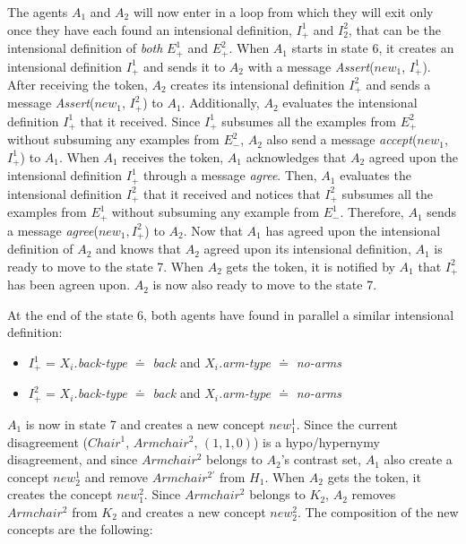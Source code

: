 The agents $A_{1}$ and $A_{2}$ will now enter in a loop from which they will exit only once they have each found an intensional definition, $I^{1}_{+}$ and $I^{2}_{2}$, that can be the intensional definition of  \emph{both} $E^{1}_{+}$ and $E^{2}_{+}$. When $A_{1}$ starts in state 6, it creates an intensional definition $I^{1}_{+}$ and sends it to $A_{2}$ with a message \emph{Assert}($new_1$, $I^{1}_{+}$). After receiving the token, $A_{2}$ creates its intensional definition  $I^{2}_{+}$ and sends a message \emph{Assert}($new_1$, $I^{2}_{+}$) to $A_{1}$. Additionally, $A_{2}$ evaluates the intensional definition $I^{1}_{+}$ that it received. Since $I^{1}_{+}$ subsumes all the examples from $E^{2}_{+}$ without subsuming any examples from $E^{2}_{-}$, $A_{2}$ also send a message \emph{accept}($new_1$, $I^{1}_{+}$) to $A_{1}$. When $A_{1}$ receives the token, $A_{1}$ acknowledges that $A_{2}$ agreed upon the intensional definition $I^{1}_{+}$ through a message \emph{agree}. Then, $A_{1}$ evaluates the intensional definition $I^{2}_{+}$ that it received and notices that $I^{2}_{+}$ subsumes all the examples from $E^{1}_{+}$ without subsuming any example from $E^{1}_{-}$. Therefore, $A_{1}$ sends a message \emph{agree}($new_1, I^{2}_{+}$) to $A_{2}$. Now that $A_{1}$ has agreed upon the intensional definition of $A_{2}$ and knows that $A_{2}$ agreed upon its intensional definition, $A_{1}$ is ready to move to the state 7. When $A_{2}$ gets the token, it is notified by $A_{1}$ that $I^{2}_{+}$ has been agreen upon. $A_{2}$ is now also ready to move to the state 7.

At the end of the state 6, both agents have found in parallel a similar intensional definition:

\begin{itemize}
    \item $I^{1}_{+}$ = \emph{$X_{i}$.back-type $\doteq$ back} and \emph{$X_{i}$.arm-type $\doteq$ no-arms}
    \item $I^{2}_{+}$ = \emph{$X_{i}$.back-type $\doteq$ back} and \emph{$X_{i}$.arm-type $\doteq$ no-arms}
\end{itemize}

$A_{1}$ is now in state 7 and creates a new concept $new_1^{1}$. Since the current disagreement ($Chair^{1}$, $Armchair^{2}$, $(1,1,0)$) is a hypo/hypernymy disagreement, and since $Armchair^{2}$ belongs to $A_{2}$'s contrast set, $A_{1}$ also create a concept $new_2^{1}$ and remove $Armchair^{2'}$ from $H_{1}$. When $A_{2}$ gets the token, it creates the concept $new_1^{2}$. Since $Armchair^{2}$ belongs to $K_{2}$, $A_{2}$ removes $Armchair^{2}$ from $K_{2}$ and creates a new concept $new_2^{2}$. The composition of the new concepts are the following:

